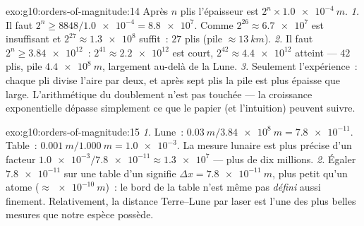 \begin{solution}{exo:g10:orders-of-magnitude:14}
Après $n$ plis l'épaisseur est $2^{n} \times \qty{1.0e-4}{m}$.
\emph{1.} Il faut $2^{n} \geq 8848/\num{1.0e-4} = \num{8.8e7}$. Comme
$2^{26} \approx \num{6.7e7}$ est insuffisant et
$2^{27} \approx \num{1.3e8}$ suffit~: $27$ plis (pile
$\approx \qty{13}{km}$).
\emph{2.} Il faut $2^{n} \geq \num{3.84e12}$~: $2^{41} \approx
\num{2.2e12}$ est court, $2^{42} \approx \num{4.4e12}$ atteint ---
$42$ plis, pile $\qty{4.4e8}{m}$, largement au-delà de la Lune.
\emph{3.} Seulement l'expérience~: chaque pli divise l'aire par deux,
et après sept plis la pile est plus épaisse que large. L'arithmétique
du doublement n'est pas touchée --- la croissance exponentielle
dépasse simplement ce que le papier (et l'intuition) peuvent suivre.
\end{solution}

\begin{solution}{exo:g10:orders-of-magnitude:15}
\emph{1.} Lune~: $\qty{0.03}{m}/\qty{3.84e8}{m} = \num{7.8e-11}$.
Table~: $\qty{0.001}{m}/\qty{1.000}{m} = \num{1.0e-3}$. La mesure
lunaire est plus précise d'un facteur
$\num{1.0e-3}/\num{7.8e-11} \approx \num{1.3e7}$ --- plus de dix
millions.
\emph{2.} Égaler $\num{7.8e-11}$ sur une table d'un  signifie
$\Delta x = \qty{7.8e-11}{m}$, plus petit qu'un atome
($\approx \qty{e-10}{m}$)~: le bord de la table n'est même pas
\emph{défini} aussi finement. Relativement, la distance Terre--Lune
par laser est l'une des plus belles mesures que notre espèce possède.
\end{solution}

